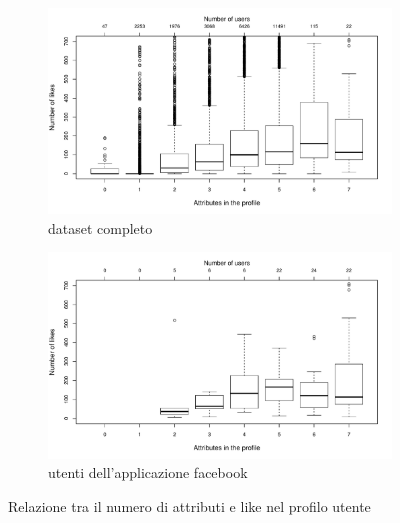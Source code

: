 \begin{figure}[h]
    \centering
    \begin{subfigure}[b]{0.47\textwidth}
		\includegraphics[width=\textwidth]{pictures/profile_vs_likes.pdf}
		\caption{dataset completo}
		\label{fig:profile_vs_likes_users}
	\end{subfigure}
	\hfill
	\begin{subfigure}[b]{0.47\textwidth}
		\includegraphics[width=\textwidth]{pictures/profile_vs_likes_dau.pdf}
		\caption{utenti dell'applicazione facebook}
		\label{fig:profile_vs_likes_daus}
	\end{subfigure}
	\caption{Relazione tra il numero di attributi e like nel profilo utente}
	\label{fig:profile_vs_likes}
\end{figure}\\
